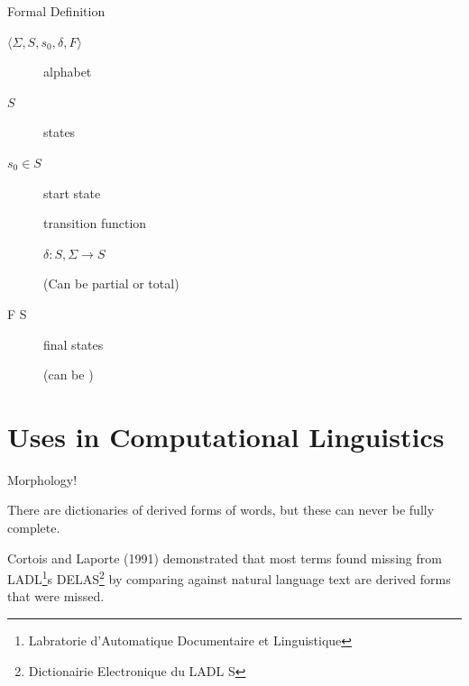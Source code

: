 \documentclass[10pt]{beamer}
\begin{document}
\begin{frame}[fragile]{Formal Definition}

  \pause

  $\langle \Sigma, S, s_0, \delta, F \rangle$


  \begin{description}

    \item[\Sigma] alphabet
    \item[$S$] states
    \item[$s_0 \in S$] start state
    \item[\delta] transition function 

    $\delta: S,\Sigma \to S$

      (Can be partial or total)
    \item[F \subset S] final states 

    (can be \emptyset) 

  \end{description}




\end{frame}

\section{Uses in Computational Linguistics}

\begin{frame}[fragile]{Morphology!}

  There are dictionaries of derived forms of words, but these can never be fully complete. 

  Cortois and Laporte (1991) demonstrated that most terms found missing from LADL\footnote{Labratorie d'Automatique Documentaire et Linguistique}s DELAS\footnote{Dictionairie Electronique du LADL S} by comparing against natural language text are derived forms that were missed. 




\end{frame}
\end{document}
